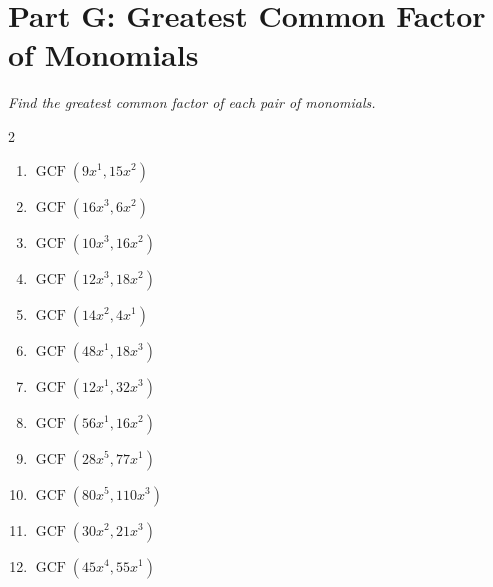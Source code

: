 \documentclass[11pt]{article}
\begin{document}
\section*{Part G: Greatest Common Factor of Monomials}
\noindent\textit{Find the greatest common factor of each pair of monomials.}
\begin{multicols}{2}
\begin{enumerate}
  \item $\operatorname{GCF}\left(9x^{1}, 15x^{2}\right)$
  \vspace{1.1cm}
  \item $\operatorname{GCF}\left(16x^{3}, 6x^{2}\right)$
  \vspace{1.1cm}
  \item $\operatorname{GCF}\left(10x^{3}, 16x^{2}\right)$
  \vspace{1.1cm}
  \item $\operatorname{GCF}\left(12x^{3}, 18x^{2}\right)$
  \vspace{1.1cm}
  \item $\operatorname{GCF}\left(14x^{2}, 4x^{1}\right)$
  \vspace{1.1cm}
  \item $\operatorname{GCF}\left(48x^{1}, 18x^{3}\right)$
  \vspace{1.1cm}
  \item $\operatorname{GCF}\left(12x^{1}, 32x^{3}\right)$
  \vspace{1.1cm}
  \item $\operatorname{GCF}\left(56x^{1}, 16x^{2}\right)$
  \vspace{1.1cm}
  \item $\operatorname{GCF}\left(28x^{5}, 77x^{1}\right)$
  \vspace{1.1cm}
  \item $\operatorname{GCF}\left(80x^{5}, 110x^{3}\right)$
  \vspace{1.1cm}
  \item $\operatorname{GCF}\left(30x^{2}, 21x^{3}\right)$
  \vspace{1.1cm}
  \item $\operatorname{GCF}\left(45x^{4}, 55x^{1}\right)$
  \vspace{1.1cm}
\end{enumerate}
\end{multicols}
\end{document}
